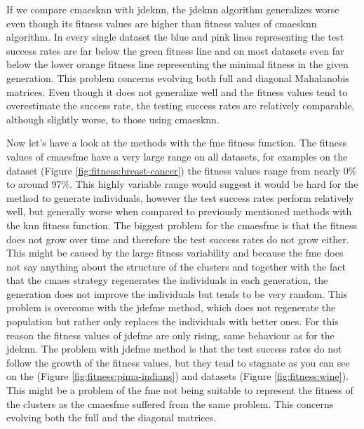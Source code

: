 \documentclass[12pt,a4paper]{report}
\begin{document}
If we compare \ac{cmaesknn} with \ac{jdeknn}, the \ac{jdeknn} algorithm generalizes worse even though its fitness values are higher than fitness values of \ac{cmaesknn} algorithm. In every single dataset the blue and pink lines representing the test success rates are far below the green fitness line and on most datasets even far below the lower orange fitness line representing the minimal fitness in the given generation. This problem concerns evolving both full and diagonal Mahalanobis matrices. Even though it does not generalize well and the fitness values tend to overestimate the success rate, the testing success rates are relatively comparable, although slightly worse, to those using \ac{cmaesknn}.

Now let's have a look at the methods with the \ac{fme} fitness function. The fitness values of \ac{cmaesfme} have a very large range on all datasets, for examples on the  dataset (Figure \ref{fig:fitness:breast-cancer}) the fitness values range from nearly 0\% to around 97\%. This highly variable range would suggest it would be hard for the method to generate individuals, however the test success rates perform relatively well, but generally worse when compared to previously mentioned methods with the \ac{knn} fitness function. The biggest problem for the \ac{cmaesfme} is that the fitness does not grow over time and therefore the test success rates do not grow either. This might be caused by the large fitness variability and because the \ac{fme} does not say anything about the structure of the clusters and together with the fact that the \ac{cmaes} strategy regenerates the individuals in each generation, the generation does not improve the individuals but tends to be very random. This problem is overcome with the \ac{jdefme} method, which does not regenerate the population but rather only replaces the individuals with better ones. For this reason the fitness values of \ac{jdefme} are only rising, same behaviour as for the \ac{jdeknn}. The problem with \ac{jdefme} method is that the test success rates do not follow the growth of the fitness values, but they tend to stagnate as you can see on the  (Figure \ref{fig:fitness:pima-indians}) and  datasets (Figure \ref{fig:fitness:wine}). This might be a problem of the \ac{fme} not being suitable to represent the fitness of the clusters as the \ac{cmaesfme} suffered from the same problem. This concerns evolving both the full and the diagonal matrices.
\end{document}

